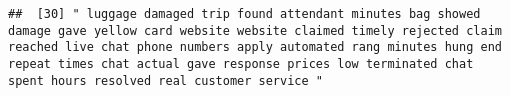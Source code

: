 \documentclass[
]{article}
\begin{document}
\begin{verbatim}
##  [30] " luggage damaged trip found attendant minutes bag showed damage gave yellow card website website claimed timely rejected claim reached live chat phone numbers apply automated rang minutes hung end repeat times chat actual gave response prices low terminated chat spent hours resolved real customer service "                                                                                                                                                                                                                                                                                                                                                                                                                                                                                                                                                                                                                                                                                                                                                                                                                                                                                                                                                                                                                                                                                                                                                                                                                                                                                                                                                                                                                                                                            

\end{verbatim}
\end{document}
